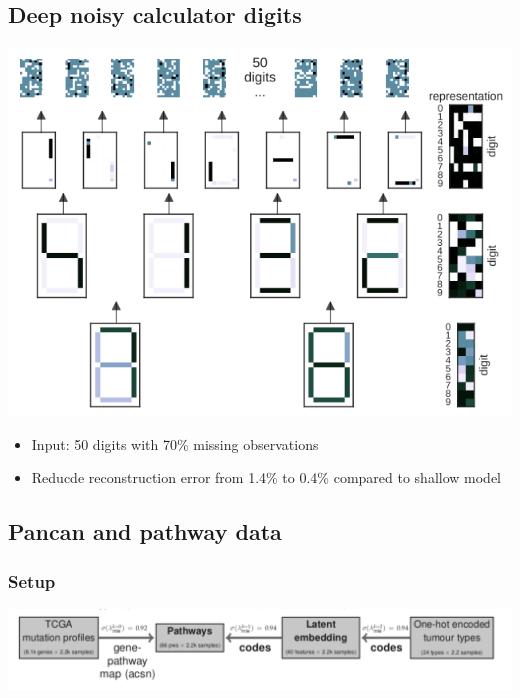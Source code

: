 \documentclass[11pt]{article}
\begin{document}
\subsection*{Deep noisy calculator digits}
\label{sec-4-8}
\includegraphics[width=.9\linewidth]{./deeper_calc.png}
\begin{itemize}
\item Input: 50 digits with 70\% missing observations
\item Reducde reconstruction error from 1.4\% to 0.4\% compared to shallow model
\end{itemize}
\subsection*{Pancan and pathway data}
\label{sec-4-9}
\subsubsection*{Setup}
\label{sec-4-9-1}
\includegraphics[width=.9\linewidth]{./arc.png}
\end{document}
